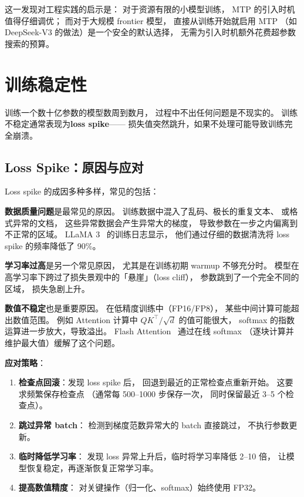 这一发现对工程实践的启示是：
对于资源有限的小模型训练，
MTP 的引入时机值得仔细调优；
而对于大规模 frontier 模型，
直接从训练开始就启用 MTP
（如 DeepSeek-V3 的做法）是一个安全的默认选择，
无需为引入时机额外花费超参数搜索的预算。

\section{训练稳定性}

训练一个数十亿参数的模型数周到数月，
过程中不出任何问题是不现实的。
训练不稳定通常表现为\textbf{loss spike}——
损失值突然跳升，如果不处理可能导致训练完全崩溃。

\subsection{Loss Spike：原因与应对}

Loss spike 的成因多种多样，常见的包括：

\textbf{数据质量问题}是最常见的原因。
训练数据中混入了乱码、极长的重复文本、
或格式异常的文档，
这些异常数据会产生异常大的梯度，
导致参数在一步之内偏离到不正常的区域。
LLaMA 3~\cite{dubey2024llama3} 的训练日志显示，
他们通过仔细的数据清洗将 loss spike 的频率降低了 90\%。

\textbf{学习率过高}是另一个常见原因，
尤其是在训练初期 warmup 不够充分时。
模型在高学习率下跨过了损失景观中的「悬崖」（loss cliff），
参数跳到了一个完全不同的区域，
损失急剧上升。

\textbf{数值不稳定}也是重要原因。
在低精度训练中（FP16/FP8），
某些中间计算可能超出数值范围。
例如 Attention 计算中 $QK^\top / \sqrt{d}$ 的值可能很大，
softmax 的指数运算进一步放大，导致溢出。
Flash Attention~\cite{dao2022flashattention} 通过在线 softmax
（逐块计算并维护最大值）缓解了这个问题。

\textbf{应对策略}：
\begin{enumerate}[noitemsep]
  \item \textbf{检查点回滚}：发现 loss spike 后，
        回退到最近的正常检查点重新开始。
        这要求频繁保存检查点
        （通常每 500--1000 步保存一次，
        同时保留最近 3--5 个检查点）。
  \item \textbf{跳过异常 batch}：
        检测到梯度范数异常大的 batch 直接跳过，
        不执行参数更新。
  \item \textbf{临时降低学习率}：
        发现 loss 异常上升后，临时将学习率降低 2--10 倍，
        让模型恢复稳定，再逐渐恢复正常学习率。
  \item \textbf{提高数值精度}：
        对关键操作（归一化、softmax）始终使用 FP32。
\end{enumerate}

